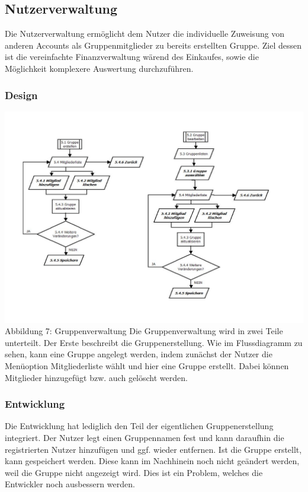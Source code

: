\documentclass[12pt,a4paper]{article}
\begin{document}
\subsection{Nutzerverwaltung}
Die Nutzerverwaltung ermöglicht dem Nutzer die individuelle Zuweisung von anderen Accounts als Gruppenmitglieder zu bereits erstellten Gruppe. Ziel dessen ist die vereinfachte Finanzverwaltung wärend des Einkaufes, sowie die Möglichkeit komplexere Auswertung durchzuführen.

\subsubsection*{Design}
\hspace*{-10mm} 
\includegraphics[trim=10mm 20mm 0mm 20mm,clip, scale=0.7]{Gruppenverwaltung.pdf}
\\
\footnotesize Abbildung 7: Gruppenverwaltung
\normalsize
\newline
\newline
Die Gruppenverwaltung wird in zwei Teile unterteilt. Der Erste beschreibt die Gruppenerstellung. Wie im Flussdiagramm zu sehen, kann eine Gruppe angelegt werden, indem zunächst der Nutzer die Menüoption Mitgliederliste wählt und hier eine Gruppe erstellt. Dabei können Mitglieder hinzugefügt bzw. auch gelöscht werden.
\subsubsection*{Entwicklung}
Die Entwicklung hat lediglich den Teil der eigentlichen Gruppenerstellung integriert. Der Nutzer legt einen Gruppennamen fest und kann daraufhin die registrierten Nutzer hinzufügen und ggf. wieder entfernen. Ist die Gruppe erstellt, kann gespeichert werden.
Diese kann im Nachhinein noch nicht geändert werden, weil die Gruppe nicht angezeigt wird. Dies ist ein Problem, welches die Entwickler noch ausbessern werden.
\newpage
\end{document}
